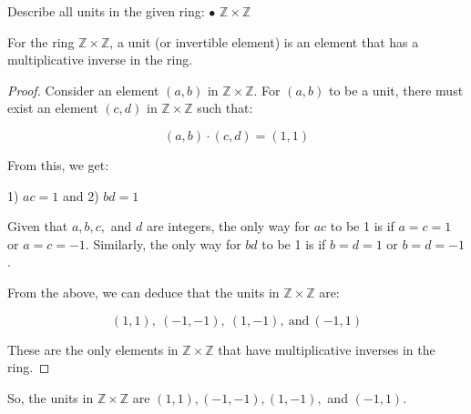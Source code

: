 \documentclass[12pt]{amsart}
\theoremstyle{definition}
\numberwithin{equation}{section}
\theoremstyle{plain}
\newcommand{\Z}{\mathbb{Z}}
\begin{document}
\vspace*{20pt}
\begin{exercise}{15}
    Describe all units in the given ring: 
    $\bullet$ $\Z \times \Z$


    For the ring \(\Z \times\Z \), a unit (or invertible element) is an element that has a multiplicative inverse in the ring.

    \begin{proof}
    Consider an element \( (a,b) \) in \(\Z \times\Z \). For \( (a,b) \) to be a unit, there must exist an element \( (c,d) \) in \(\Z \times\Z \) such that:
    
    \[ (a,b) \cdot (c,d) = (1,1) \]
    
    From this, we get:
    
    1) \( ac = 1 \) and
    2) \( bd = 1 \)
    
    Given that \( a, b, c, \) and \( d \) are integers, the only way for \( ac \) to be 1 is if \( a = c = 1 \) or \( a = c = -1 \). Similarly, the only way for \( bd \) to be 1 is if \( b = d = 1 \) or \( b = d = -1 \).
    
    From the above, we can deduce that the units in \(\Z \times\Z \) are:
    
    \[ (1,1), \ (-1,-1), \ (1,-1), \ \text{and} \ (-1,1) \]
    
    These are the only elements in \(\Z \times\Z \) that have multiplicative inverses in the ring.
    \end{proof}
    
    So, the units in \(\Z \times\Z \) are \( (1,1), (-1,-1), (1,-1), \) and \( (-1,1) \).\\

\end{exercise}
\vspace*{20pt}
\end{document}

